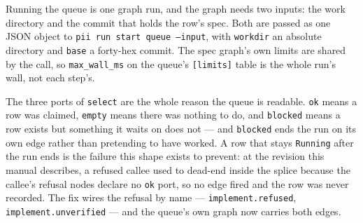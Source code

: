 Running the queue is one graph run, and the graph needs two inputs: the work directory and
the commit that holds the row's spec. Both are passed as one JSON object to
\texttt{pii run start queue --input}, with \texttt{workdir} an absolute directory and
\texttt{base} a forty-hex commit. The spec graph's own limits are shared by the call, so
\texttt{max\_wall\_ms} on the queue's \texttt{[limits]} table is the whole run's wall, not
each step's.

\begin{center}
\end{center}

The three ports of \texttt{select} are the whole reason the queue is readable.
\texttt{ok} means a row was claimed, \texttt{empty} means there was nothing to do, and
\texttt{blocked} means a row exists but something it waits on does not --- and \texttt{blocked}
ends the run on its own edge rather than pretending to have worked. A row that stays
\texttt{Running} after the run ends is the failure this shape exists to prevent: at the
revision this manual describes, a refused callee used to dead-end inside the splice
because the callee's refusal nodes declare no \texttt{ok} port, so no edge fired and the
row was never recorded. The fix wires the refusal by name ---
\texttt{implement.refused}, \texttt{implement.unverified} --- and the queue's own graph now
carries both edges.

